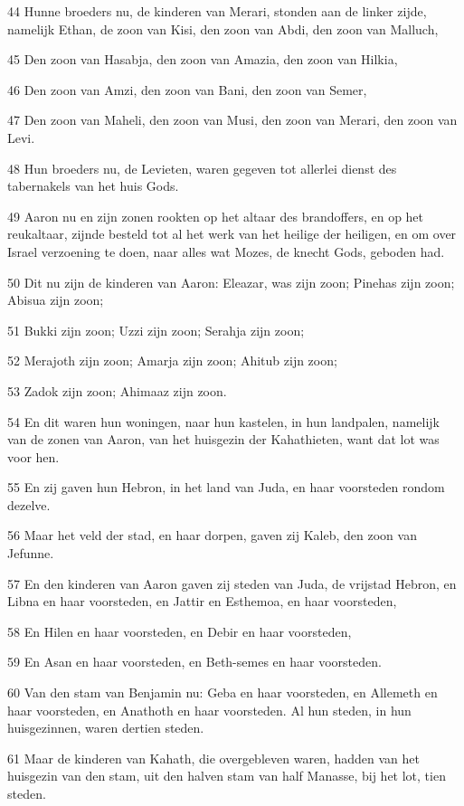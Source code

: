 \par 44 Hunne broeders nu, de kinderen van Merari, stonden aan de linker zijde, namelijk Ethan, de zoon van Kisi, den zoon van Abdi, den zoon van Malluch,
\par 45 Den zoon van Hasabja, den zoon van Amazia, den zoon van Hilkia,
\par 46 Den zoon van Amzi, den zoon van Bani, den zoon van Semer,
\par 47 Den zoon van Maheli, den zoon van Musi, den zoon van Merari, den zoon van Levi.
\par 48 Hun broeders nu, de Levieten, waren gegeven tot allerlei dienst des tabernakels van het huis Gods.
\par 49 Aaron nu en zijn zonen rookten op het altaar des brandoffers, en op het reukaltaar, zijnde besteld tot al het werk van het heilige der heiligen, en om over Israel verzoening te doen, naar alles wat Mozes, de knecht Gods, geboden had.
\par 50 Dit nu zijn de kinderen van Aaron: Eleazar, was zijn zoon; Pinehas zijn zoon; Abisua zijn zoon;
\par 51 Bukki zijn zoon; Uzzi zijn zoon; Serahja zijn zoon;
\par 52 Merajoth zijn zoon; Amarja zijn zoon; Ahitub zijn zoon;
\par 53 Zadok zijn zoon; Ahimaaz zijn zoon.
\par 54 En dit waren hun woningen, naar hun kastelen, in hun landpalen, namelijk van de zonen van Aaron, van het huisgezin der Kahathieten, want dat lot was voor hen.
\par 55 En zij gaven hun Hebron, in het land van Juda, en haar voorsteden rondom dezelve.
\par 56 Maar het veld der stad, en haar dorpen, gaven zij Kaleb, den zoon van Jefunne.
\par 57 En den kinderen van Aaron gaven zij steden van Juda, de vrijstad Hebron, en Libna en haar voorsteden, en Jattir en Esthemoa, en haar voorsteden,
\par 58 En Hilen en haar voorsteden, en Debir en haar voorsteden,
\par 59 En Asan en haar voorsteden, en Beth-semes en haar voorsteden.
\par 60 Van den stam van Benjamin nu: Geba en haar voorsteden, en Allemeth en haar voorsteden, en Anathoth en haar voorsteden. Al hun steden, in hun huisgezinnen, waren dertien steden.
\par 61 Maar de kinderen van Kahath, die overgebleven waren, hadden van het huisgezin van den stam, uit den halven stam van half Manasse, bij het lot, tien steden.
